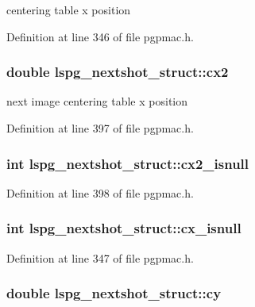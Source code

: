 centering table x position 



Definition at line 346 of file pgpmac.\-h.

\hypertarget{structlspg__nextshot__struct_a10d45763100bc59f9a5f68f1b48db6d3}{
\subsubsection[{cx2}]{\setlength{\rightskip}{0pt plus 5cm}double lspg\-\_\-nextshot\-\_\-struct\-::cx2}}\label{structlspg__nextshot__struct_a10d45763100bc59f9a5f68f1b48db6d3}


next image centering table x position 



Definition at line 397 of file pgpmac.\-h.

\hypertarget{structlspg__nextshot__struct_a3ad947f4efe2cb5c338244b019334749}{
\subsubsection[{cx2\-\_\-isnull}]{\setlength{\rightskip}{0pt plus 5cm}int lspg\-\_\-nextshot\-\_\-struct\-::cx2\-\_\-isnull}}\label{structlspg__nextshot__struct_a3ad947f4efe2cb5c338244b019334749}


Definition at line 398 of file pgpmac.\-h.

\hypertarget{structlspg__nextshot__struct_a779b99533f0ed4e659177afb0b791ad2}{
\subsubsection[{cx\-\_\-isnull}]{\setlength{\rightskip}{0pt plus 5cm}int lspg\-\_\-nextshot\-\_\-struct\-::cx\-\_\-isnull}}\label{structlspg__nextshot__struct_a779b99533f0ed4e659177afb0b791ad2}


Definition at line 347 of file pgpmac.\-h.

\hypertarget{structlspg__nextshot__struct_ab7a7b37a17f06c4e9ebdcdf056946098}{
\subsubsection[{cy}]{\setlength{\rightskip}{0pt plus 5cm}double lspg\-\_\-nextshot\-\_\-struct\-::cy}}\label{structlspg__nextshot__struct_ab7a7b37a17f06c4e9ebdcdf056946098}


